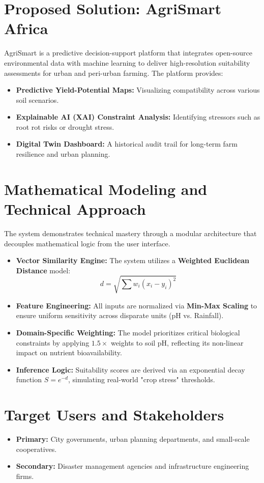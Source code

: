 \documentclass[11pt]{article}
\begin{document}
\section{Proposed Solution: AgriSmart Africa}
AgriSmart is a predictive decision-support platform that integrates open-source environmental data with machine learning to deliver high-resolution suitability assessments for urban and peri-urban farming. The platform provides:
\begin{itemize}[noitemsep]
    \item \textbf{Predictive Yield-Potential Maps:} Visualizing compatibility across various soil scenarios.
    \item \textbf{Explainable AI (XAI) Constraint Analysis:} Identifying stressors such as root rot risks or drought stress.
    \item \textbf{Digital Twin Dashboard:} A historical audit trail for long-term farm resilience and urban planning.
\end{itemize}

\section{Mathematical Modeling and Technical Approach}
The system demonstrates technical mastery through a modular architecture that decouples mathematical logic from the user interface.
\begin{itemize}
    \item \textbf{Vector Similarity Engine:} The system utilizes a \textbf{Weighted Euclidean Distance} model:
    \[ d = \sqrt{\sum w_i (x_i - y_i)^2} \]
    \item \textbf{Feature Engineering:} All inputs are normalized via \textbf{Min-Max Scaling} to ensure uniform sensitivity across disparate units (pH vs. Rainfall).
    \item \textbf{Domain-Specific Weighting:} The model prioritizes critical biological constraints by applying $1.5\times$ weights to soil pH, reflecting its non-linear impact on nutrient bioavailability.
    \item \textbf{Inference Logic:} Suitability scores are derived via an exponential decay function $S = e^{-d}$, simulating real-world "crop stress" thresholds.
\end{itemize}

\section{Target Users and Stakeholders}
\begin{itemize}[noitemsep]
    \item \textbf{Primary:} City governments, urban planning departments, and small-scale cooperatives.
    \item \textbf{Secondary:} Disaster management agencies and infrastructure engineering firms.
\end{itemize}
\end{document}

